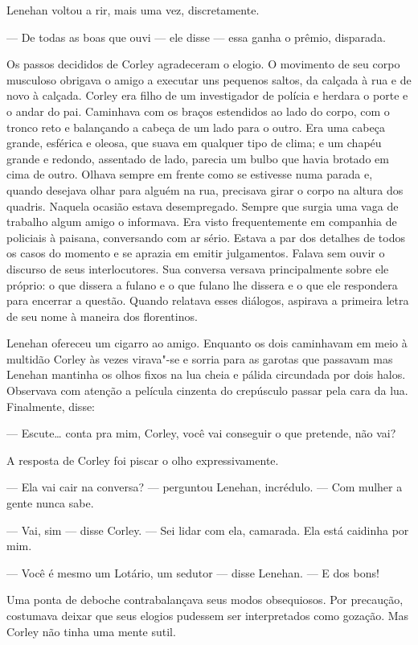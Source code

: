 Lenehan voltou a rir, mais uma vez, discretamente.

--- De todas as boas que ouvi --- ele disse --- essa ganha o prêmio, disparada.

Os passos decididos de Corley agradeceram o elogio.  O movimento de seu corpo
musculoso obrigava o amigo a executar uns pequenos saltos, da calçada à rua e
de novo à calçada.  Corley era filho de um investigador de polícia e herdara o
porte e o andar do pai.  Caminhava com os braços estendidos ao lado do corpo,
com o tronco reto e balançando a cabeça de um lado para o outro.  Era uma
cabeça grande, esférica e oleosa, que suava em qualquer tipo de clima; e um
chapéu grande e redondo, assentado de lado, parecia um bulbo que havia brotado
em cima de outro.  Olhava sempre em frente como se estivesse numa parada e,
quando desejava olhar para alguém na rua, precisava girar o corpo na altura dos
quadris.  Naquela ocasião estava desempregado.  Sempre que surgia uma vaga de
trabalho algum amigo o informava.  Era visto frequentemente em companhia de
policiais à paisana, conversando com ar sério.  Estava a par dos detalhes de
todos os casos do momento e se aprazia em emitir julgamentos.  Falava sem ouvir
o discurso de seus interlocutores.  Sua conversa versava principalmente sobre
ele próprio: o que dissera a fulano e o que fulano lhe dissera e o que ele
respondera para encerrar a questão.  Quando relatava esses diálogos, aspirava a
primeira letra de seu nome à maneira dos florentinos.

Lenehan ofereceu um cigarro ao amigo.  Enquanto os dois caminhavam em meio à
multidão Corley às vezes virava"-se e sorria para as garotas que passavam mas
Lenehan mantinha os olhos fixos na lua cheia e pálida circundada por dois
halos.  Observava com atenção a película cinzenta do crepúsculo passar pela
cara da lua.  Finalmente, disse:

--- Escute\ldots{} conta pra mim, Corley, você vai conseguir o que pretende,
não vai?

A resposta de Corley foi piscar o olho expressivamente.

--- Ela vai cair na conversa? --- perguntou Lenehan, incrédulo.  --- Com mulher
a gente nunca sabe.

--- Vai, sim --- disse Corley.  --- Sei lidar com ela, camarada.  Ela está
caidinha por mim.

--- Você é mesmo um Lotário, um sedutor --- disse Lenehan.  --- E dos bons!

Uma ponta de deboche contrabalançava seus modos obsequiosos.  Por precaução,
costumava deixar que seus elogios pudessem ser interpretados como gozação.  Mas
Corley não tinha uma mente sutil.

